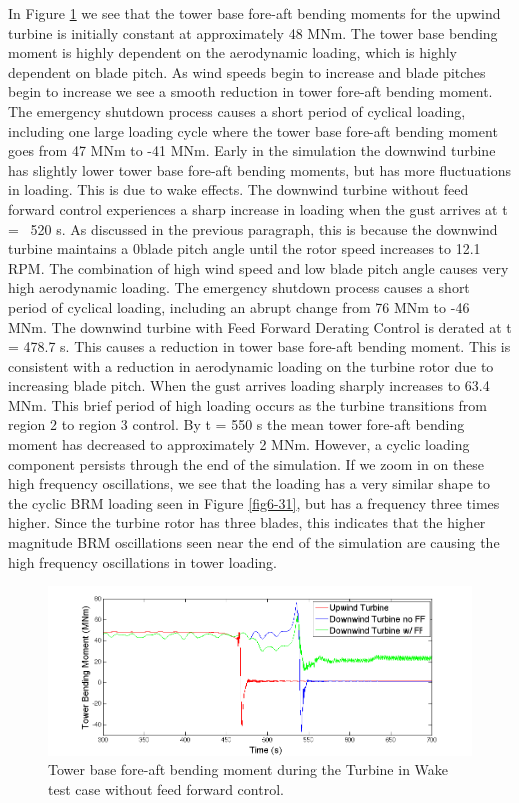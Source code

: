 In Figure \ref{fig6-32} we see that the tower base fore-aft bending moments for the upwind turbine is initially constant at approximately 48 MNm. The tower base bending moment is highly dependent on the aerodynamic loading, which is highly dependent on blade pitch. As wind speeds begin to increase and blade pitches begin to increase we see a smooth reduction in tower fore-aft bending moment. The emergency shutdown process causes a short period of cyclical loading, including one large loading cycle where the tower base fore-aft bending moment goes from 47 MNm to -41 MNm. Early in the simulation the downwind turbine has slightly lower tower base fore-aft bending moments, but has more fluctuations in loading. This is due to wake effects. The downwind turbine without feed forward control experiences a sharp increase in loading when the gust arrives at t = ~520 s. As discussed in the previous paragraph, this is because the downwind turbine maintains a 0\degree blade pitch angle until the rotor speed increases to 12.1 RPM. The combination of high wind speed and low blade pitch angle causes very high aerodynamic loading. The emergency shutdown process causes a short period of cyclical loading, including an abrupt change from 76 MNm to -46 MNm. The downwind turbine with Feed Forward Derating Control is derated at t = 478.7 s. This causes a reduction in tower base fore-aft bending moment. This is consistent with a reduction in aerodynamic loading on the turbine rotor due to increasing blade pitch. When the gust arrives loading sharply increases to 63.4 MNm. This brief period of high loading occurs as the turbine transitions from region 2 to region 3 control. By t = 550 s the mean tower fore-aft bending moment has decreased to approximately 2 MNm. However, a cyclic loading component persists through the end of the simulation. If we zoom in on these high frequency oscillations, we see that the loading has a very similar shape to the cyclic BRM loading seen in Figure \ref{fig6-31}, but has a frequency three times higher. Since the turbine rotor has three blades, this indicates that the higher magnitude BRM oscillations seen near the end of the simulation are causing the high frequency oscillations in tower loading. 


\begin{figure}[!htbp] 
	\centering
		\includegraphics[width = \linewidth]{Figures/ch6Figures/fig6-32.png}

	\caption{Tower base fore-aft bending moment during the Turbine in Wake test case without feed forward control.}
	\label{fig6-32}
\end{figure}


